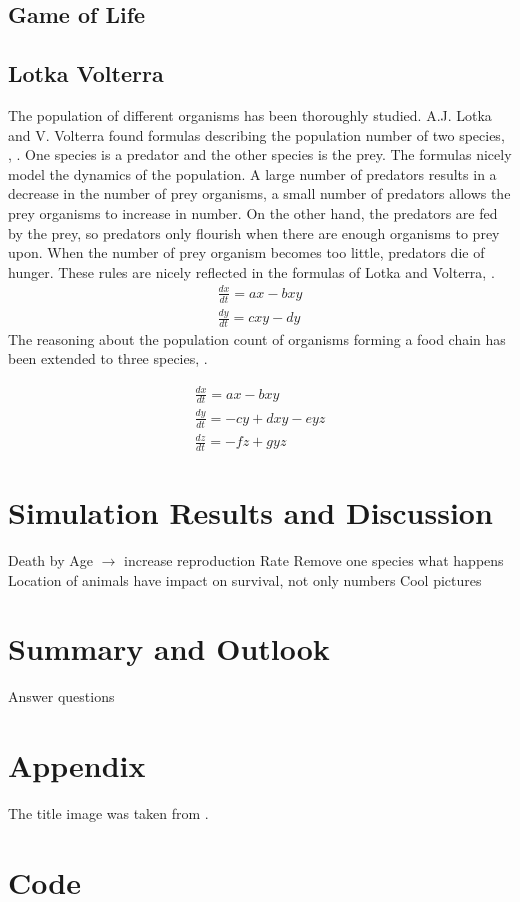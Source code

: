 \documentclass[11pt]{article}
\begin{document}
\subsection{Game of Life}

\subsection{Lotka Volterra}
The population of different organisms has been thoroughly studied. A.J. Lotka and V. Volterra found formulas describing the population number of two species, \cite{lotka}, \cite{volterra}. One species is a predator and the other species is the prey. The formulas nicely model the dynamics of the population. A large number of predators results in a decrease in the number of prey organisms, a small number of predators allows the prey organisms to increase in number. On the other hand, the predators are fed by the prey, so predators only flourish when there are enough organisms to prey upon. When the number of prey organism becomes too little, predators die of hunger. These rules are nicely reflected in the formulas of Lotka and Volterra, \cite{lotkaVolterra}.\\

\begin{equation}
\begin{split}
\frac{dx}{dt} = ax-bxy \\ 
\frac{dy}{dt} = cxy-dy
\end{split}
\end{equation}
The reasoning about the population count of organisms forming a food chain has been extended to three species, \cite{lotkaVolterraThreeSpecies}. 

\begin{equation}
\begin{split}
\frac{dx}{dt} = ax-bxy \\ 
\frac{dy}{dt} = -cy+dxy-eyz \\ 
\frac{dz}{dt} = -fz+gyz
\end{split}
\end{equation}

\section{Simulation Results and Discussion}
Death by Age $\rightarrow$ increase reproduction Rate
Remove one species what happens
Location of animals have impact on survival, not only numbers
Cool pictures

\section{Summary and Outlook}
Answer questions

\appendix

\section{Appendix}
The title image was taken from \cite{titleImage}.

\section{Code}



\end{document}
